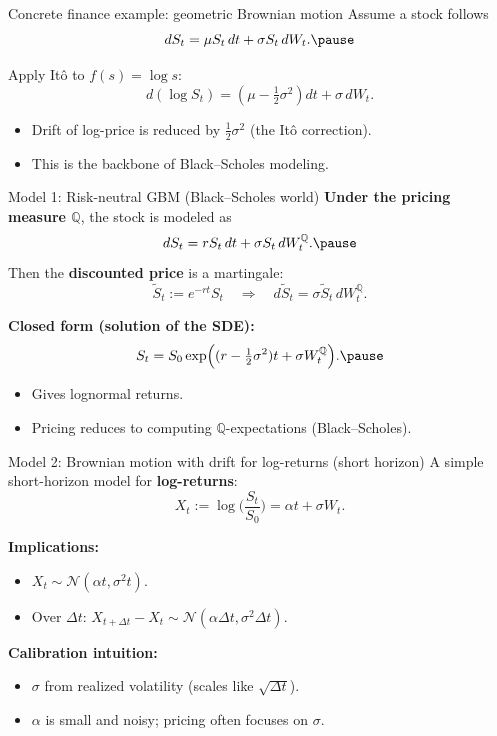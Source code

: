 \documentclass[10pt,aspectratio=169]{beamer}
\begin{document}
\begin{frame}{Concrete finance example: geometric Brownian motion}
Assume a stock follows
\[
dS_t=\mu S_t\,dt + \sigma S_t\,dW_t.\pause
\]

Apply It\^o to $f(s)=\log s$:
\[
d(\log S_t)=\left(\mu-\tfrac12\sigma^2\right)\!dt + \sigma\,dW_t.
\]

\begin{itemize}
  \item Drift of log-price is reduced by $\tfrac12\sigma^2$ (the It\^o correction).
  \item This is the backbone of Black--Scholes modeling.
\end{itemize}
\end{frame}

\begin{frame}{Model 1: Risk-neutral GBM (Black--Scholes world)}
\textbf{Under the pricing measure $\mathbb{Q}$}, the stock is modeled as
\[
dS_t = r S_t\,dt + \sigma S_t\,dW_t^{\mathbb{Q}}.\pause
\]
Then the \textbf{discounted price} is a martingale:
\[
\tilde S_t := e^{-rt}S_t
\quad\Rightarrow\quad
d\tilde S_t = \sigma \tilde S_t\, dW_t^{\mathbb{Q}}.
\]

\medskip
\textbf{Closed form (solution of the SDE):}
\[
S_t = S_0\exp\!\Big((r-\tfrac12\sigma^2)t+\sigma W_t^{\mathbb{Q}}\Big).\pause
\]

\medskip
\begin{itemize}
  \item Gives lognormal returns.
  \item Pricing reduces to computing $\mathbb{Q}$-expectations (Black--Scholes).
\end{itemize}
\end{frame}

\begin{frame}{Model 2: Brownian motion with drift for log-returns (short horizon)}
A simple short-horizon model for \textbf{log-returns}:
\[
X_t := \log\!\Big(\frac{S_t}{S_0}\Big)
= \alpha t + \sigma W_t.
\]

\medskip
\textbf{Implications:}
\begin{itemize}
  \item $X_t \sim \mathcal{N}(\alpha t,\sigma^2 t)$.
  \item Over $\Delta t$: \quad $X_{t+\Delta t}-X_t \sim \mathcal{N}(\alpha\Delta t,\sigma^2\Delta t)$.
\end{itemize}

\medskip
\textbf{Calibration intuition:}
\begin{itemize}
  \item $\sigma$ from realized volatility (scales like $\sqrt{\Delta t}$).
  \item $\alpha$ is small and noisy; pricing often focuses on $\sigma$.
\end{itemize}
\end{frame}
\end{document}
